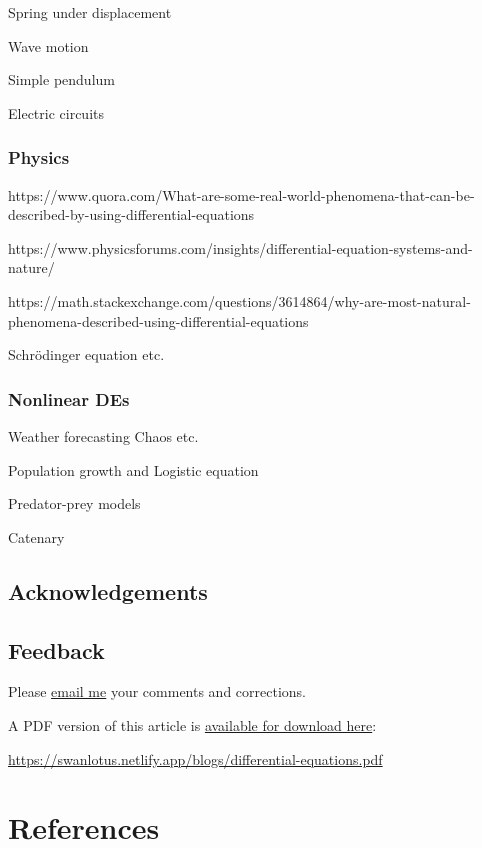 \documentclass[
  a4paper,
]{article}
\begin{document}
Spring under displacement

Wave motion

Simple pendulum

Electric circuits

\subsubsection{Physics}\label{physics}

https://www.quora.com/What-are-some-real-world-phenomena-that-can-be-described-by-using-differential-equations

https://www.physicsforums.com/insights/differential-equation-systems-and-nature/

https://math.stackexchange.com/questions/3614864/why-are-most-natural-phenomena-described-using-differential-equations

Schrödinger equation etc.

\subsubsection{Nonlinear DEs}\label{nonlinear-des}

Weather forecasting Chaos etc.

Population growth and Logistic equation

Predator-prey models

Catenary

\subsection{Acknowledgements}\label{acknowledgements}

\subsection{Feedback}\label{feedback}

Please \href{mailto:feedback.swanlotus@gmail.com}{email me} your
comments and corrections.

\noindent A PDF version of this article is
\href{./differetial-equations.pdf}{available for download here}:

\begin{sffamily}

\url{https://swanlotus.netlify.app/blogs/differential-equations.pdf}

\end{sffamily}

\section*{References}\label{bibliography}
\end{document}
